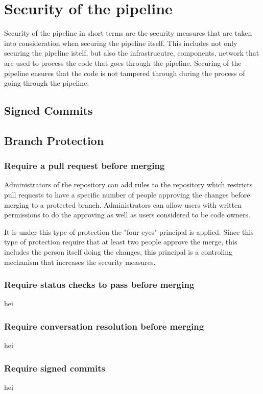 \section{Security of the pipeline}
Security of the pipeline in short terms are the security measures that are taken into consideration when securing the pipeline itself. This includes not only securing the pipeline istelf, but also the infrastrucutre, components, network that are used to process the code that goes through the pipeline. Securing of the pipeline ensures that the code is not tampered through during the process of going through the pipeline. 

\subsection{Signed Commits}

\subsection{Branch Protection}

\subsubsection{Require a pull request before merging}
Administrators of the repository can add rules to the repository which restricts pull requests to have a specific number of people approving the changes before merging to a protected branch. Administrators can allow users with written permissions to do the approving as well as users considered to be code owners. \cite{ProtectedBranches}

It is under this type of protection the "four eyes" principal is applied. Since this type of protection require that at least two people approve the merge, this includes the person itself doing the changes, this principal is a controling mechanism that increases the security measures. 
\subsubsection{Require status checks to pass before merging}
hei
\subsubsection{Require conversation resolution before merging}
hei
\subsubsection{Require signed commits}
hei
